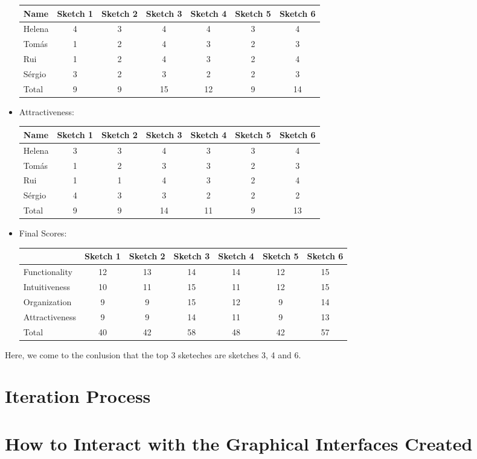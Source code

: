 \begin{itemize}
\begin{table}[H]
        \begin{tabular}{l*{6}{c}}
            Name & Sketch 1 & Sketch 2 & Sketch 3 & Sketch 4 & Sketch 5 & Sketch 6 \\
            \hline 
            Helena & 4 & 3 & 4 & 4 & 3 & 4 \\
            Tomás & 1 & 2 & 4 & 3 & 2 & 3 \\ 
            Rui & 1 & 2 & 4 & 3 & 2 & 4 \\ 
            Sérgio & 3 & 2 & 3 & 2 & 2 & 3 \\ 
            \hline
            Total & 9 & 9 & 15 & 12 & 9 & 14 \\
        \end{tabular}
        \end{table}
    \item Attractiveness:
    \begin{table}[H]
        \begin{tabular}{l*{6}{c}}
            Name & Sketch 1 & Sketch 2 & Sketch 3 & Sketch 4 & Sketch 5 & Sketch 6 \\
            \hline 
            Helena & 3 & 3 & 4 & 3 & 3 & 4 \\
            Tomás & 1 & 2 & 3 & 3 & 2 & 3 \\ 
            Rui & 1 & 1 & 4 & 3 & 2 & 4 \\ 
            Sérgio & 4 & 3 & 3 & 2 & 2 & 2 \\ 
            \hline
            Total & 9 & 9 & 14 & 11 & 9 & 13 \\
        \end{tabular}
        \end{table}
    \item Final Scores: 
    \begin{table}[H]
        \begin{tabular}{l*{6}{c}}
            & Sketch 1 & Sketch 2 & Sketch 3 & Sketch 4 
            & Sketch 5 & Sketch 6 \\
            \hline 
            Functionality & 12 & 13 & 14 & 14 & 12 & 15  \\
            Intuitiveness & 10 & 11 & 15 & 11 & 12 & 15  \\ 
            Organization & 9 & 9 & 15 & 12 & 9 & 14  \\ 
            Attractiveness & 9 & 9 & 14 & 11 & 9 & 13  \\ 
            \hline
            Total & 40 & 42 & 58 & 48 & 42 & 57  \\
        \end{tabular}
    \end{table}
\end{itemize} \par
Here, we come to the conlusion that the top 3 sketeches are
sketches 3, 4 and 6. 
\section{Iteration Process}
\section{How to Interact with the Graphical Interfaces Created}
